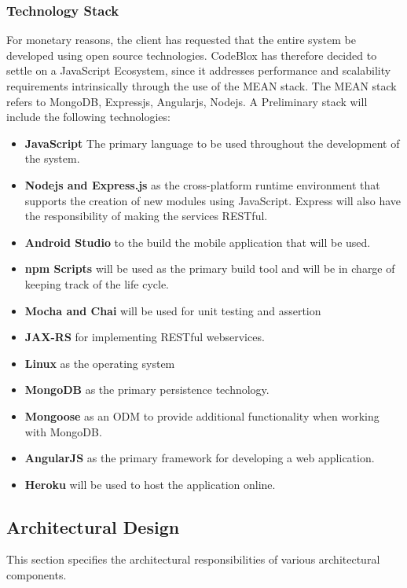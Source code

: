 \documentclass[a4paper,12pt]{article}
\begin{document}
	\subsubsection{Technology Stack}
	For monetary reasons, the client has requested that the entire system be developed using open source technologies. CodeBlox has therefore decided to settle on a JavaScript Ecosystem, since it addresses performance and scalability requirements intrinsically through the use of the MEAN stack. The MEAN stack refers to MongoDB, Expressjs, Angularjs, Nodejs. A Preliminary stack will include the following technologies:
	
	\begin{itemize}
		\item \textbf{JavaScript} The primary language to be used throughout the development of the system.
		\item \textbf{Nodejs and Express.js} as the cross-platform runtime environment that supports the creation of new modules using JavaScript. Express will also have the responsibility of making the services RESTful. 
		\item \textbf{Android Studio} to the build the mobile application that will be used.
		\item \textbf{npm Scripts} will be used as the primary build tool and will be in charge of keeping track of the life cycle.
		\item \textbf{Mocha and Chai} will be used for unit testing and assertion
		\item \textbf{JAX-RS} for implementing RESTful webservices.
		\item \textbf{Linux} as the operating system
		\item \textbf{MongoDB} as the primary persistence technology.
		\item \textbf{Mongoose} as an ODM to provide additional functionality when working with MongoDB.
		\item \textbf{AngularJS} as the primary framework for developing a web application.
		\item \textbf{Heroku} will be used to host the application online.
	\end{itemize}
	
	\newpage
	\subsection{Architectural Design}
	This section specifies the architectural responsibilities of various architectural components.
\end{document}
